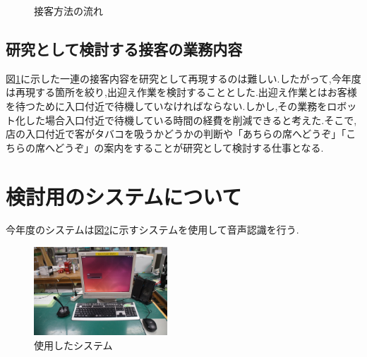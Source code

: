 \documentclass[twocolumn,11pt]{sotsuken_abst}
\begin{document}
\begin{figure}[htbp]
\scriptsize
{}
%
\caption{接客方法の流れ}
\label{fig:customer-service}%
\normalsize
\end{figure}

\subsection{研究として検討する接客の業務内容}
図\ref{fig:customer-service}に示した一連の接客内容を研究として再現するのは難しい.したがって,今年度は再現する箇所を絞り,出迎え作業を検討することとした.出迎え作業とはお客様を待つために入口付近で待機していなければならない.しかし,その業務をロボット化した場合入口付近で待機している時間の経費を削減できると考えた.そこで,店の入口付近で客がタバコを吸うかどうかの判断や「あちらの席へどうぞ」「こちらの席へどうぞ」の案内をすることが研究として検討する仕事となる.


\section{検討用のシステムについて}
今年度のシステムは図\ref{fig:robot}に示すシステムを使用して音声認識を行う.


\begin{figure}[htbp]
\begin{center}
\includegraphics[width=50mm]{img/robo.JPG}
\caption{使用したシステム}
\label{fig:robot}
\end{center}
\end{figure}
\end{document}
